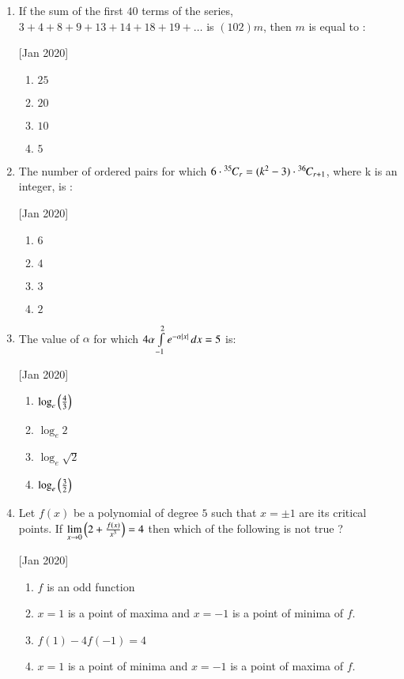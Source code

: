 \documentclass[journal,12pt,twocolumn]{IEEEtran}
\theoremstyle{remark}
\begin{document}
\begin{enumerate}
    \item If the sum of the first $40$ terms of the series, $3+4+8+9+13+14+18+19+\dots$ is $(102)m$, then $m$ is equal to :
    
    \hfill[Jan 2020]
        \begin{enumerate}
            \item $25$
            \item $20$
            \item $10$
            \item $5$
        \end{enumerate}

    \item The number of ordered pairs  for which $6\cdot{{}^{35}\mkern-1muC_{r}}=(k^2-3)\cdot{{}^{36}\mkern-1muC_{r+1}}$, where k is an integer, is :
    
    \hfill[Jan 2020]
        \begin{enumerate}
            \item $6$
            \item $4$
            \item $3$
            \item $2$
        \end{enumerate}

    \item The value of $\alpha$ for which $4\alpha\int\limits_{-1}^{2}e^{-\alpha\left\vert x\right\vert}\,dx=5$ is:
    
    \hfill[Jan 2020]
        \begin{enumerate}
            \item $\log_e\left(\frac{4}{3}\right)$
            \item $\log_e2$
            \item $\log_e\sqrt{2}$
            \item $\log_e\left(\frac{3}{2}\right)$
        \end{enumerate}

    \item Let $f(x)$ be a polynomial of degree $5$ such that $x=\pm1$ are its critical points. If $\lim\limits_{x\to0}\left(2+\frac{f(x)}{x^3}\right)=4$ then which of the following is not true ?
    
    \hfill[Jan 2020]
        \begin{enumerate}
            \item $f$ is an odd function
            \item $x=1$ is a point of maxima and $x=-1$ is a point of minima of $f$.
            \item $f(1)-4f(-1)=4$
            \item $x=1$ is a point of minima and $x=-1$ is a point of maxima of $f$.
        \end{enumerate}


\end{enumerate}
\end{document}
